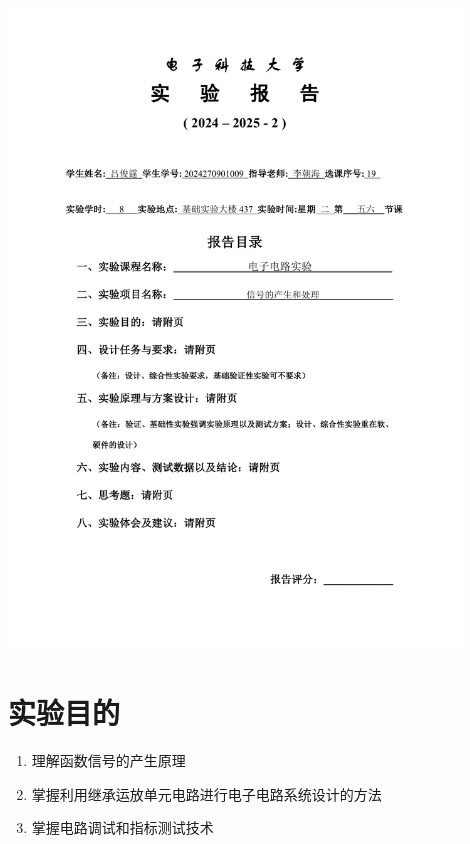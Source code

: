\documentclass[12pt, a4paper]{article} %
\begin{document}
\sloppy

\begin{titlepage}
    \centering
    \includegraphics[page=1, width=0.9\textwidth, keepaspectratio]{image/实验报告撰写封面.pdf}
    \restoregeometry
\end{titlepage}

\setcounter{section}{2}

\section{实验目的}

\begin{enumerate}[leftmargin=50pt,label=(\arabic*)] %
    \item 理解函数信号的产生原理
    \item 掌握利用继承运放单元电路进行电子电路系统设计的方法
    \item 掌握电路调试和指标测试技术
\end{enumerate}
\end{document}
